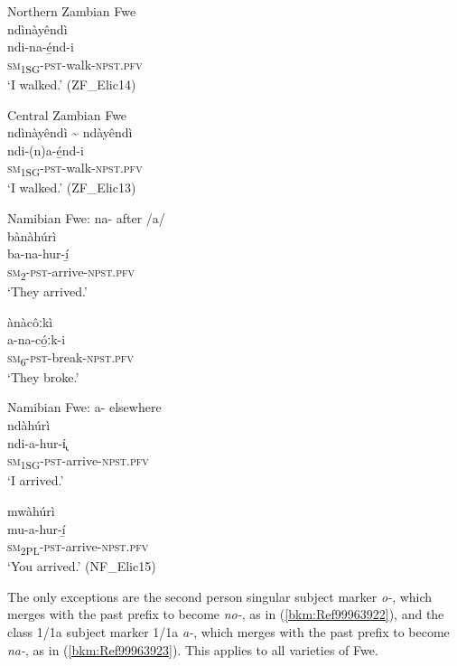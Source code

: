 \ea
\label{bkm:Ref99963857}
Northern Zambian Fwe\\
ndìnàyêndì\\
\gll ndi-na-é̲nd-i\\
\textsc{sm}\textsubscript{1SG}-\textsc{pst}-walk-\textsc{npst}.\textsc{pfv}\\
\glt ‘I walked.’ (ZF\_Elic14)
\z

\ea
\label{bkm:Ref99963868}
Central Zambian Fwe\\
ndìnàyêndì {\textasciitilde} ndàyêndì\\
\gll ndi-(n)a-é̲nd-i\\
\textsc{sm}\textsubscript{1SG}-\textsc{pst}-walk-\textsc{npst}.\textsc{pfv}\\
\glt ‘I walked.’ (ZF\_Elic13)
\z

\ea
\label{bkm:Ref99963894}
\ea
Namibian Fwe: na- after /a/\\
bànàhúrì\\
\gll ba-na-hur-í̲\\
\textsc{sm}\textsubscript{2}-\textsc{pst}-arrive-\textsc{npst}.\textsc{pfv}\\
\glt ‘They arrived.’

\ex
\glll ànàcôːkì\\
a-na-có̲ːk-i\\
\textsc{sm}\textsubscript{6}-\textsc{pst}-break-\textsc{npst}.\textsc{pfv}\\
\glt ‘They broke.’
\z\z

\ea
\label{bkm:Ref99963896}
\ea
Namibian Fwe: a- elsewhere\\
ndàhúrì\\
\gll ndi-a-hur-í̢\\
\textsc{sm}\textsubscript{1SG}-\textsc{pst}-arrive-\textsc{npst}.\textsc{pfv}\\
\glt ‘I arrived.’

\ex
\glll mwàhúrì\\
mu-a-hur-í̲\\
\textsc{sm}\textsubscript{2PL}-\textsc{pst}-arrive-\textsc{npst}.\textsc{pfv}\\
\glt ‘You arrived.’ (NF\_Elic15)
\z\z

The only exceptions are the second person singular subject marker \textit{o-}, which merges with the past prefix to become \textit{no-}, as in (\ref{bkm:Ref99963922}), and the class 1/1a subject marker 1/1a \textit{a-}, which merges with the past prefix to become \textit{na-}, as in (\ref{bkm:Ref99963923}). This applies to all varieties of Fwe.

